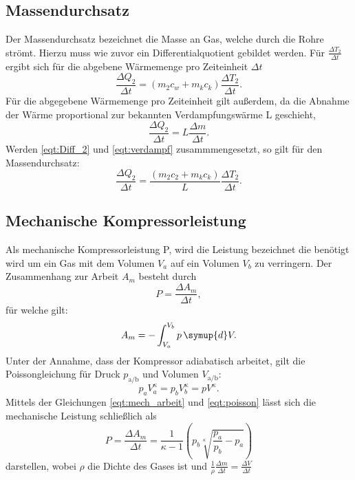   \subsection{Massendurchsatz}
    Der Massendurchsatz bezeichnet die Masse an Gas, welche durch die Rohre strömt.
    Hierzu muss wie zuvor ein Differentialquotient gebildet werden. Für $\frac {\Delta T_2}{\Delta t}$ ergibt sich für die abgebene Wärmemenge pro Zeiteinheit $\Delta t$
    \begin{equation}
      \label{eqt:Diff_2}
      \frac {\Delta Q_2} {\Delta t} = (m_2 c_w + m_k c_k) \frac {\Delta T_2} {\Delta t}.
    \end{equation}
    Für die abgegebene Wärmemenge pro Zeiteinheit gilt außerdem, da die Abnahme der Wärme proportional zur bekannten Verdampfungswärme L geschieht, 
    \begin{equation}
      \label{eqt:verdampf}
      \frac {\Delta Q_2}{\Delta t} = L \frac {\Delta m} {\Delta t} .
    \end{equation}
    Werden \ref {eqt:Diff_2} und \ref {eqt:verdampf} zusammmengesetzt, so gilt für den Massendurchsatz:
    \begin{equation}
      \label{eqt:massendurchsatz}
      \frac {\Delta Q_2} {\Delta t} = \frac {(m_2 c_2 + m_k c_k)}{L} \frac {\Delta T_2} {\Delta t} .
    \end{equation}

  \subsection{Mechanische Kompressorleistung}
    Als mechanische Kompressorleistung P, wird die Leistung bezeichnet die benötigt wird um ein Gas mit dem Volumen $V_a$ auf ein Volumen $V_b$ zu verringern.
    Der Zusammenhang zur Arbeit $A_m$ besteht durch
    \begin{equation}
      P = \frac {\Delta A_m} {\Delta t},
    \end{equation}
    für welche gilt:
    \begin{equation}
      \label{eqt:mech_arbeit}
      A_m = - \int_{V_a}^{V_b} p \, \symup{d}V .
    \end{equation}
    Unter der Annahme, dass der Kompressor adiabatisch arbeitet, gilt die Poissongleichung für Druck $p_\text{a/b}$ und Volumen $V_\text{a/b}$:
    \begin{equation}
      \label{eqt:poisson}
      p_a V_a^\kappa = p_b V_b^\kappa = p V^\kappa .
    \end{equation}
    Mittels der Gleichungen \ref {eqt:mech_arbeit} und \ref {eqt:poisson} lässt sich die mechanische Leistung schließlich als
    \begin{equation}
      \label{eqt:mech_leistung}
      P = \frac {\Delta A_m} {\Delta t} = \frac {1}{\kappa -1} (p_b \sqrt[\kappa]{\frac{p_a}{p_b} - p_a } )  
    \end{equation}  
    darstellen, wobei $\rho$ die Dichte des Gases ist und $\frac {1}{\rho} \frac {\Delta m} {\Delta t} = \frac {\Delta V}{\Delta t}$